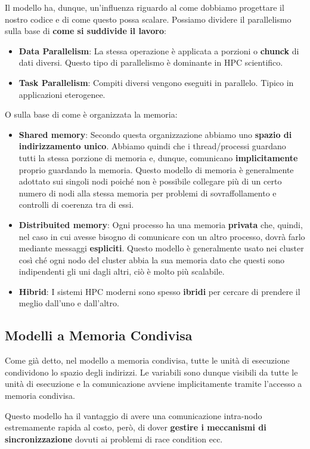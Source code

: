 Il modello ha, dunque, un'influenza riguardo al come dobbiamo progettare il nostro codice e di come questo possa scalare.
Possiamo dividere il parallelismo sulla base di \textbf{come si suddivide il lavoro}:
\begin{itemize}
    \item \textbf{Data Parallelism}: La stessa operazione è applicata a porzioni o \textbf{chunck} di dati diversi. Questo tipo di parallelismo è dominante in HPC scientifico.
    \item \textbf{Task Parallelism}: Compiti diversi vengono eseguiti in parallelo. Tipico in applicazioni eterogenee.
\end{itemize}
O sulla base di come è organizzata la memoria:
\begin{itemize}
    \item \textbf{Shared memory}: Secondo questa organizzazione abbiamo uno \textbf{spazio di indirizzamento unico}. Abbiamo quindi che i thread/processi guardano tutti la stessa porzione di memoria e, dunque, comunicano \textbf{implicitamente} proprio guardando la memoria. Questo modello di memoria è generalmente adottato sui singoli nodi poiché non è possibile collegare più di un certo numero di nodi alla stessa memoria per problemi di sovraffollamento e controlli di coerenza tra di essi.
    \item \textbf{Distribuited memory}: Ogni processo ha una memoria \textbf{privata} che, quindi, nel caso in cui avesse bisogno di comunicare con un altro processo, dovrà farlo mediante messaggi \textbf{espliciti}. Questo modello è generalmente usato nei cluster così ché ogni nodo del cluster abbia la sua memoria dato che questi sono indipendenti gli uni dagli altri, ciò è molto più scalabile.
    \item \textbf{Hibrid}: I sistemi HPC moderni sono spesso \textbf{ibridi} per cercare di prendere il meglio dall'uno e dall'altro. 
\end{itemize}
\subsection*{Modelli a Memoria Condivisa}
Come già detto, nel modello a memoria condivisa, tutte le unità di esecuzione condividono lo spazio degli indirizzi.
Le variabili sono dunque visibili da tutte le unità di esecuzione e la comunicazione avviene implicitamente tramite l'accesso a memoria condivisa.

Questo modello ha il vantaggio di avere una comunicazione intra-nodo estremamente rapida al costo, però, di dover \textbf{gestire i meccanismi di sincronizzazione} dovuti ai problemi di race condition ecc.
